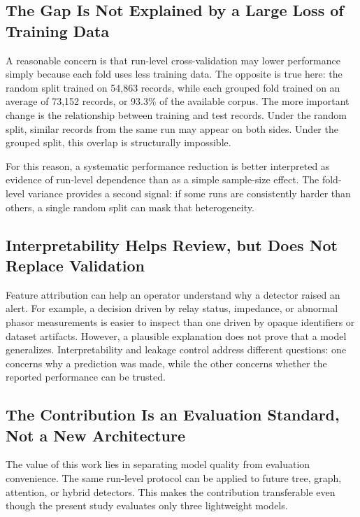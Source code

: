 \documentclass[conference,a4paper]{IEEEtran}
\begin{document}
\subsection{The Gap Is Not Explained by a Large Loss of Training Data}

A reasonable concern is that run-level cross-validation may lower performance simply because each fold uses less training data. The opposite is true here: the random split trained on 54,863 records, while each grouped fold trained on an average of 73,152 records, or 93.3\% of the available corpus. The more important change is the relationship between training and test records. Under the random split, similar records from the same run may appear on both sides. Under the grouped split, this overlap is structurally impossible.

For this reason, a systematic performance reduction is better interpreted as evidence of run-level dependence than as a simple sample-size effect. The fold-level variance provides a second signal: if some runs are consistently harder than others, a single random split can mask that heterogeneity.

\subsection{Interpretability Helps Review, but Does Not Replace Validation}

Feature attribution can help an operator understand why a detector raised an alert. For example, a decision driven by relay status, impedance, or abnormal phasor measurements is easier to inspect than one driven by opaque identifiers or dataset artifacts. However, a plausible explanation does not prove that a model generalizes. Interpretability and leakage control address different questions: one concerns why a prediction was made, while the other concerns whether the reported performance can be trusted.

\subsection{The Contribution Is an Evaluation Standard, Not a New Architecture}

The value of this work lies in separating model quality from evaluation convenience. The same run-level protocol can be applied to future tree, graph, attention, or hybrid detectors. This makes the contribution transferable even though the present study evaluates only three lightweight models.
\end{document}
